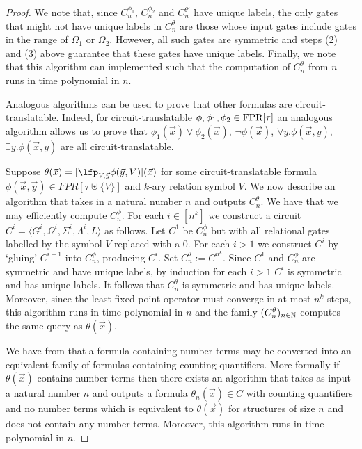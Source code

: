 \documentclass[../paper.tex]{subfiles}
\begin{document}
\begin{proof}
  We note that, since $C^{\phi_1}_n$, $C^{\phi_2}_n$ and $C^{\theta'}_n$ have
  unique labels, the only gates that might not have unique labels in
  $C^{\theta}_n$ are those whose input gates include gates in the range of
  $\Omega_1$ or $\Omega_2$. However, all such gates are symmetric and steps (2)
  and (3) above guarantee that these gates have unique labels. Finally, we note
  that this algorithm can implemented such that the computation of
  $C^{\theta}_n$ from $n$ runs in time polynomial in $n$.

  Analogous algorithms can be used to prove that other formulas are
  circuit-translatable. Indeed, for circuit-translatable $\phi, \phi_1, \phi_2
  \in \text{\upshape FPR}[\tau]$ an analogous algorithm allows us to prove that
  $\phi_1(\vec{x}) \lor \phi_2(\vec{x})$, $\neg \phi(\vec{x})$, $\forall y. \phi
  (\vec{x}, y)$, $\exists y. \phi (\vec{x}, y)$ are all circuit-translatable.

  Suppose $\theta(\vec{x}) = [\lfp_{V, \vec{y}} \phi(\vec{y}, V)](\vec{x})$ for
  some circuit-translatable formula $\phi(\vec{x}, \vec{y}) \in FPR[\tau \uplus
  \{V\}]$ and $k$-ary relation symbol $V$. We now describe an algorithm that
  takes in a natural number $n$ and outputs $C^{\theta}_n$. We have that we may
  efficiently compute $C^{\phi}_n$. For each $i \in [n^k]$ we construct a
  circuit $C^i = \langle G^i, \Omega^i, \Sigma^i, \Lambda^i, L \rangle $ as
  follows. Let $C^1$ be $C^{\phi}_n$ but with all relational gates labelled by
  the symbol $V$ replaced with a $0$. For each $i>1$ we construct $C^{i}$ by
  `gluing' $C^{i-1}$ into $C^\phi_n$, producing $C^i$. Set $C^{\theta}_n :=
  C^{n^k}$. Since $C^1$ and $C^\phi_n$ are symmetric and have unique labels, by
  induction for each $i > 1$ $C^i$ is symmetric and has unique labels. It
  follows that $C^{\theta}_n$ is symmetric and has unique labels. Moreover,
  since the least-fixed-point operator must converge in at most $n^k$ steps,
  this algorithm runs in time polynomial in $n$ and the family
  $(C^{\theta}_n)_{n \in \mathbb{N}}$ computes the same query as $\theta(\vec{x})$.

  We have from \cite{} that a formula containing number terms may be converted
  into an equivalent family of formulas containing counting quantifiers. More
  formally if $\theta (\vec{x})$ contains number terms then there exists an
  algorithm that takes as input a natural number $n$ and outputs a formula
  $\theta_n(\vec{x}) \in C$ with counting quantifiers and no number terms which
  is equivalent to $\theta(\vec{x})$ for structures of size $n$ and does not
  contain any number terms. Moreover, this algorithm runs in time polynomial in
  $n$.


\end{proof}
\end{document}
